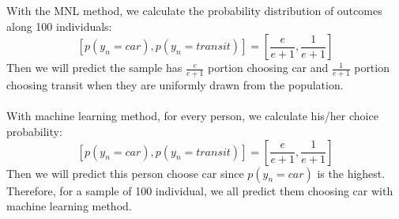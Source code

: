 \documentclass[11pt]{article}
\begin{document}
\section{}
With the MNL method, we calculate the probability distribution of outcomes along 100 individuals:
\begin{equation}
\left[p(y_n=car),p(y_n=transit)\right]=\left[\frac{e}{e+1},\frac{1}{e+1}\right]
\end{equation}
Then we will predict the sample has $\frac{e}{e+1}$ portion choosing car and $\frac{1}{e+1}$ portion choosing transit when they are uniformly drawn from the population.\\\\
With machine learning method, for every person, we calculate his/her choice probability:
\begin{equation}
\left[p(y_n=car),p(y_n=transit)\right]=\left[\frac{e}{e+1},\frac{1}{e+1}\right]
\end{equation}
Then we will predict this person choose car since $p(y_n=car)$ is the highest. Therefore, for a sample of 100 individual, we all predict them choosing car with machine learning method.
\end{document}
